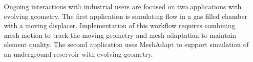 Ongoing interactions with industrial users are focused on two applications with
evolving geometry.
The first application is simulating flow in a gas filled chamber with a moving
displacer.
Implementation of this workflow requires combining mesh motion to track the
moving geometry and mesh adaptation to maintain element quality.
The second application uses MeshAdapt to support simulation of an underground
reservoir with evolving geometry.
